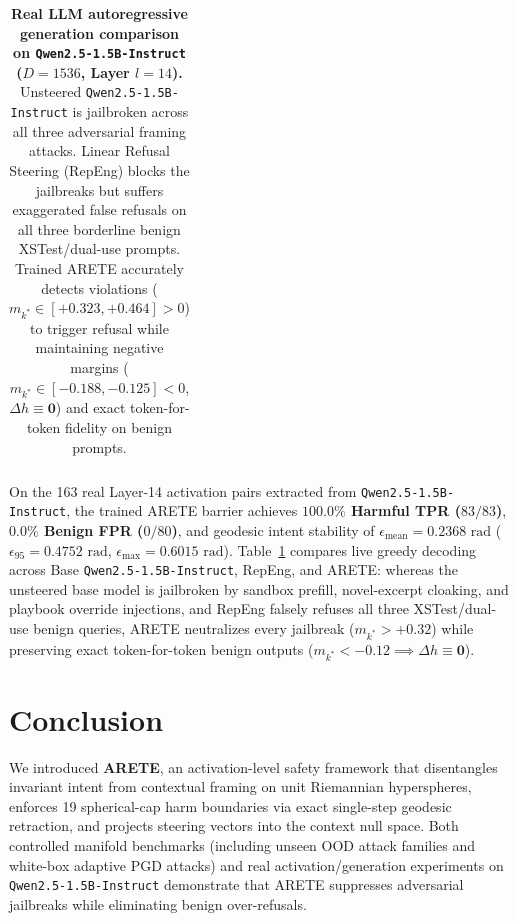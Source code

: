 \documentclass[11pt,twocolumn,a4paper]{article}
\begin{document}
\begin{table}[t]
{\begin{tabular}{p{0.23\linewidth}|p{0.25\linewidth}|p{0.25\linewidth}|p{0.25\linewidth}}
\bottomrule
\end{tabular}
}
\caption{\textbf{Real LLM autoregressive generation comparison on \texttt{Qwen2.5-1.5B-Instruct} ($D=1536$, Layer $l=14$).} Unsteered \texttt{Qwen2.5-1.5B-Instruct} is jailbroken across all three adversarial framing attacks. Linear Refusal Steering (RepEng) blocks the jailbreaks but suffers exaggerated false refusals on all three borderline benign XSTest/dual-use prompts. Trained ARETE accurately detects violations ($m_{k^*} \in [+0.323, +0.464] > 0$) to trigger refusal while maintaining negative margins ($m_{k^*} \in [-0.188, -0.125] < 0$, $\Delta h \equiv \mathbf{0}$) and exact token-for-token fidelity on benign prompts.}
\label{tab:qwen_generations}
\end{table}

On the 163 real Layer-14 activation pairs extracted from \texttt{Qwen2.5-1.5B-Instruct}, the trained ARETE barrier achieves \textbf{$100.0\%$ Harmful TPR ($83/83$)}, \textbf{$0.0\%$ Benign FPR ($0/80$)}, and geodesic intent stability of $\epsilon_{\text{mean}} = 0.2368\text{ rad}$ ($\epsilon_{95} = 0.4752\text{ rad}$, $\epsilon_{\max} = 0.6015\text{ rad}$). Table~\ref{tab:qwen_generations} compares live greedy decoding across Base \texttt{Qwen2.5-1.5B-Instruct}, RepEng, and ARETE: whereas the unsteered base model is jailbroken by sandbox prefill, novel-excerpt cloaking, and playbook override injections, and RepEng falsely refuses all three XSTest/dual-use benign queries, ARETE neutralizes every jailbreak ($m_{k^*} > +0.32$) while preserving exact token-for-token benign outputs ($m_{k^*} < -0.12 \implies \Delta h \equiv \mathbf{0}$).

\section{Conclusion}
\label{sec:conclusion}
We introduced \textbf{ARETE}, an activation-level safety framework that disentangles invariant intent from contextual framing on unit Riemannian hyperspheres, enforces 19 spherical-cap harm boundaries via exact single-step geodesic retraction, and projects steering vectors into the context null space. Both controlled manifold benchmarks (including unseen OOD attack families and white-box adaptive PGD attacks) and real activation/generation experiments on \texttt{Qwen2.5-1.5B-Instruct} demonstrate that ARETE suppresses adversarial jailbreaks while eliminating benign over-refusals.
\end{document}
